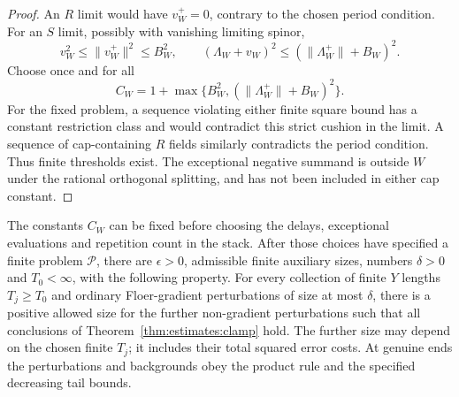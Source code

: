 \begin{proof}
An $R$ limit would have $v_W^+=0$, contrary to the chosen period
condition.  For an $S$ limit, possibly with vanishing limiting
spinor,
\[
 v_W^2\leq\|v_W^+\|^2\leq B_W^2,\qquad
 (\Lambda_W+v_W)^2
       \leq(\|\Lambda_W^+\|+B_W)^2.
\]
Choose once and for all
\begin{equation}
 C_W=1+\max\{B_W^2,(\|\Lambda_W^+\|+B_W)^2\}.
 \label{eq:estimates:CW}
\end{equation}
For the fixed problem, a sequence violating either finite square
bound has a constant restriction class and would contradict this
strict cushion in the limit.  A sequence of cap-containing $R$
fields similarly contradicts the period condition.  Thus finite
thresholds exist.  The exceptional negative summand is outside
$W$ under the rational orthogonal splitting, and has not been
included in either cap constant.
\end{proof}

\begin{corollary}
\label{cor:estimates:choices}
The constants $C_W$ can be fixed before choosing the delays,
exceptional evaluations and repetition count in the stack.  After
those choices have specified a finite problem $\mathcal P$, there
are $\epsilon>0$, admissible finite auxiliary sizes, numbers
$\delta>0$ and $T_0<\infty$, with the following property.  For every
collection of finite $Y$ lengths $T_j\geq T_0$ and ordinary
Floer-gradient perturbations of size at most $\delta$, there is a
positive allowed size for the further non-gradient perturbations
such that all conclusions of Theorem~\ref{thm:estimates:clamp} hold.
The further size may depend on the chosen finite $T_j$; it includes
their total squared error costs.  At genuine ends the perturbations
and backgrounds obey the product rule and the specified decreasing
tail bounds.
\end{corollary}

